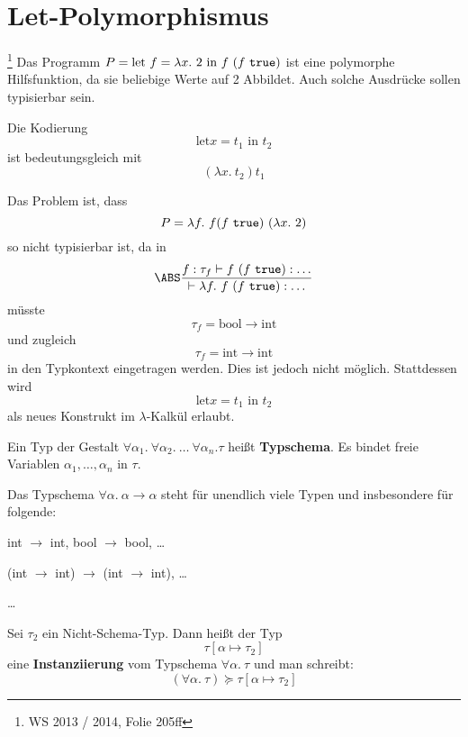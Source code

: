 \section{Let-Polymorphismus}\footnote{WS 2013 / 2014, Folie 205ff}%
Das Programm $P = \text{let } f = \lambda x.\ 2 \text{ in } f\ (f\ \text{\texttt{true}})$
ist eine polymorphe Hilfsfunktion, da sie beliebige Werte auf 2 Abbildet.
Auch solche Ausdrücke sollen typisierbar sein.

Die Kodierung 
\[\text{let} x = t_1 \text{ in } t_2\]
ist bedeutungsgleich mit
\[(\lambda x.\ t_2) t_1\]

Das Problem ist, dass 
\[P = \lambda f. \ f (f\ \text{\texttt{true}})\ (\lambda x.\ 2)\]
so nicht typisierbar ist, da in
\[\ABS \frac{f: \tau_f \vdash f\ (f\ \text{\texttt{true}}): \dots}{\vdash \lambda f.\ f\ (f\ \text{\texttt{true}}): \dots}\]
müsste 
\[\tau_f = \text{bool} \rightarrow \text{int}\]
und zugleich
\[\tau_f = \text{int} \rightarrow \text{int}\]
in den Typkontext eingetragen werden. Dies ist jedoch nicht möglich. Stattdessen
wird 
\[\text{let} x = t_1 \text{ in } t_2\]
als neues Konstrukt im $\lambda$-Kalkül erlaubt.

\begin{definition}[Typschema]%
    Ein Typ der Gestalt $\forall \alpha_1.\ \forall \alpha_2.\ \dots\ \forall \alpha_n. \tau$
    heißt \textbf{Typschema}. Es bindet freie Variablen $\alpha_1, \dots, \alpha_n$
    in $\tau$.
\end{definition}

\begin{beispiel}[Typschema]
    Das Typschema $\forall \alpha.\ \alpha \rightarrow \alpha$ steht für unendlich
    viele Typen und insbesondere für folgende:
    \begin{bspenum}
        \item int $\rightarrow$ int, bool $\rightarrow$ bool, \dots
        \item (int $\rightarrow$ int) $\rightarrow$ (int $\rightarrow$ int), \dots
        \item \dots
    \end{bspenum}
\end{beispiel}

\begin{definition}[Typschemainstanziierung]%
    Sei $\tau_2$ ein Nicht-Schema-Typ. Dann heißt der Typ
    \[\tau[\alpha \mapsto \tau_2]\]
    eine \textbf{Instanziierung} vom Typschema $\forall \alpha.\ \tau$
    und man schreibt:
    \[(\forall \alpha.\ \tau) \succeq \tau [\alpha \mapsto \tau_2]\]
\end{definition}

